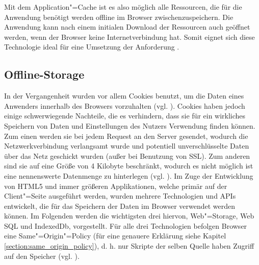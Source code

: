 Mit dem Application"=Cache ist es also möglich alle Ressourcen, die für die Anwendung benötigt werden offline im Browser zwischenzuspeichern. Die Anwendung kann nach einem initialen Download der Ressourcen auch geöffnet werden, wenn der Browser keine Internetverbindung hat. Somit eignet sich diese Technologie ideal für eine Umsetzung der Anforderung .

\subsection{Offline-Storage}\label{section:offline_storage}
In der Vergangenheit wurden vor allem Cookies benutzt, um die Daten eines Anwenders innerhalb des Browsers vorzuhalten (vgl. \cite{Mahemoff22010}). Cookies haben jedoch einige schwerwiegende Nachteile, die es verhindern, dass sie für ein wirkliches Speichern von Daten und Einstellungen des Nutzers Verwendung finden können. Zum einen werden sie bei jedem Request an den Server gesendet, wodurch die Netzwerkverbindung verlangsamt wurde und potentiell unverschlüsselte Daten über das Netz geschickt wurden (außer bei Benutzung von SSL). Zum anderen sind sie auf eine Größe von 4 Kilobyte beschränkt, wodurch es nicht möglich ist eine nennenswerte Datenmenge zu hinterlegen (vgl. \cite{html5upandrunningchapter7}). Im Zuge der Entwicklung von HTML5 und immer größeren Applikationen, welche primär auf der Client"=Seite ausgeführt werden, wurden mehrere Technologien und APIs entwickelt, die für das Speichern der Daten im Browser verwendet werden können. Im Folgenden werden die wichtigsten drei hiervon, Web"=Storage, Web SQL und IndexedDb, vorgestellt. Für alle drei Technologien befolgen Browser eine Same"=Origin"=Policy (für eine genauere Erklärung siehe Kapitel \ref{section:same_origin_policy}), d. h. nur Skripte der selben Quelle haben Zugriff auf den Speicher (vgl. \cite{Mahemoff2010}).

